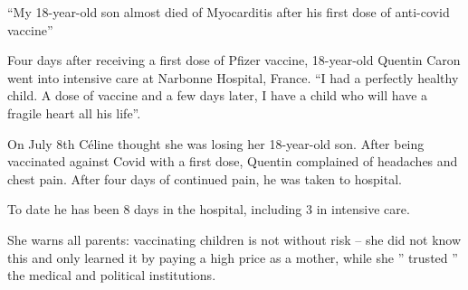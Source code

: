 “My 18-year-old son almost died of Myocarditis after his first dose of
anti-covid vaccine”

Four days after receiving a first dose of Pfizer vaccine, 18-year-old Quentin
Caron went into intensive care at Narbonne Hospital, France. “I had a perfectly
healthy child. A dose of vaccine and a few days later, I have a child who will
have a fragile heart all his life”.

On July 8th Céline thought she was losing her 18-year-old son. After being
vaccinated against Covid with a first dose, Quentin complained of headaches and
chest pain. After four days of continued pain, he was taken to hospital.

To date he has been 8 days in the hospital, including 3 in intensive care.

She warns all parents: vaccinating children is not without risk – she did not
know this and only learned it by paying a high price as a mother, while she ”
trusted ” the medical and political institutions.


